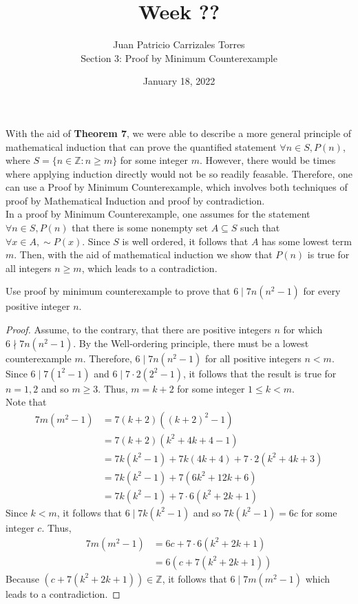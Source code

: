 \documentclass[12pt]{article}
\newcommand{\Z}{\mathbb{Z}}
\newenvironment{problem}[2][Problem]{\begin{trivlist}
		\item[\hskip \labelsep {\bfseries #1}\hskip \labelsep {\bfseries #2.}]}{\end{trivlist}}
\begin{document}
	
	\title{Week ??}
	\author{Juan Patricio Carrizales Torres \\
		Section 3: Proof by Minimum Counterexample}
	\date{January 18, 2022}
	\maketitle
	
	With the aid of \textbf{Theorem 7}, we were able to describe a more general principle of mathematical induction that can prove the 
	quantified statement $\forall n\in S, P(n)$, where $S = \{n\in \Z: n\geq m\}$ for some integer $m$. However, there would be times
	where applying induction directly would not be so readily feasable. Therefore, one can use a Proof by Minimum Counterexample, which involves
	both techniques of proof by Mathematical Induction and proof by contradiction. \\ 
	
	In a proof by Minimum Counterexample, one assumes for the statement $\forall n\in S, P(n)$ that there is some nonempty set $A\subseteq S$ such that $\forall x \in A, \sim P(x)$. Since $S$ is well ordered, it follows that $A$ has some lowest term $m$. Then, with the aid of mathematical induction we show that $P(n)$ is true for all integers $n \geq m$, which leads to a contradiction.
	
	\begin{problem}{33}
		Use proof by minimum counterexample to prove that $6\mid 7n\left(n^{2}-1\right)$ for every positive integer $n$.
		\begin{proof}
			Assume, to the contrary, that there are positive integers $n$ for which $6\nmid 7n\left(n^{2}-1\right)$. By the Well-ordering principle, there must be a lowest counterexample $m$. Therefore, $6\mid 7n\left(n^{2}-1\right)$ for all positive integers $n<m$. Since $6\mid 7\left(1^{2}-1\right)$ and $6\mid 7\cdot 2\left(2^{2}-1\right)$, it follows that the result is true for $n=1,2$ and so $m\geq 3$. Thus, $m=k+2$ for some integer $1\leq k <m$.\\
			
			Note that 
			\begin{align*} 
				7m\left(m^{2}-1\right) &= 7(k+2)\left((k+2)^{2}-1\right)\\
				&= 7(k+2)\left(k^{2}+4k+4-1\right)\\
				&= 7k(k^{2}-1) + 7k(4k+4)+ 7\cdot 2\left(k^{2}+4k+3\right)\\
				&= 7k(k^{2}-1) + 7\left(6k^{2}+12k+6\right)\\
				&= 7k(k^{2}-1) +7\cdot 6\left(k^{2}+2k+1\right)
			\end{align*}
		Since $k<m$, it follows that $6 \mid 7k(k^{2}-1)$ and so $7k(k^{2}-1) = 6c$ for some integer $c$. Thus,
		\begin{align*}
			7m\left(m^{2}-1\right) 
			&= 6c + 7\cdot 6\left(k^{2}+2k+1\right)\\
			&= 6\left(c+ 7\left(k^{2}+2k+1\right)\right)
		\end{align*}
	Because $\left(c+ 7\left(k^{2}+2k+1\right)\right) \in \Z$, it follows that $6\mid 7m\left(m^{2}-1\right)$ which leads to a contradiction.
		\end{proof}
	\end{problem}
\end{document}
